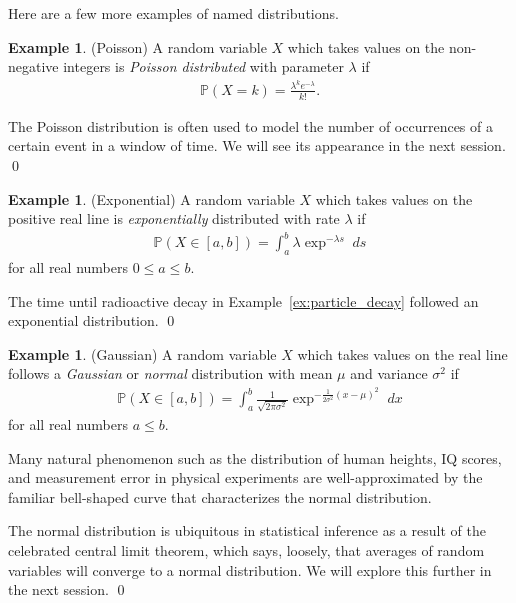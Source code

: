 \documentclass[11pt]{article}
\theoremstyle{definition}
\newtheorem{example}[theorem]{Example}
\renewcommand{\P}{\mathbb{P}}
\begin{document}
Here are a few more examples of named distributions.

\begin{example}(Poisson)
A random variable $X$ which takes values on the non-negative integers is
\textit{Poisson distributed} with parameter $\lambda$ if
\begin{align}
  \P(X = k) = \frac{\lambda^k e^{-\lambda}}{k!}.
  \label{eq:poisson}
\end{align}

The Poisson distribution is often used to model the number of occurrences
of a certain event in a window of time. We will see its appearance in the next session.
\qed
\end{example}

\begin{example}(Exponential)
A random variable $X$ which takes values on the positive real line is
\textit{exponentially} distributed with rate $\lambda$ if
\begin{align}
  \P(X \in [a, b]) =
  \int_a^b \lambda \exp^{-\lambda s} \;ds
  \label{eq:exponential}
\end{align}
for all real numbers $0 \leq a \leq b$.

The time until radioactive decay in Example~\ref{ex:particle_decay}
followed an exponential distribution.
\qed
\end{example}

\begin{example}(Gaussian)
A random variable $X$ which takes values on the real line follows a
\textit{Gaussian} or \textit{normal} distribution with mean $\mu$ and variance
$\sigma^2$ if
\begin{align}
  \P(X \in [a, b]) =
  \int_a^b \frac{1}{\sqrt{2\pi\sigma^2}}
  \exp^{-\frac{1}{2\sigma^2}(x - \mu)^2} \; dx
  \label{eq:normal}
\end{align}
for all real numbers $a \leq b$.

Many natural phenomenon such as the distribution of human heights, IQ scores, and
measurement error in physical experiments are well-approximated by the familiar
bell-shaped curve that characterizes the normal distribution.

The normal distribution is ubiquitous in statistical inference as a result of
the celebrated central limit theorem, which says, loosely, that averages
of random variables will converge to a normal distribution. We will explore this further in the next session.
\qed
\end{example}
\end{document}
